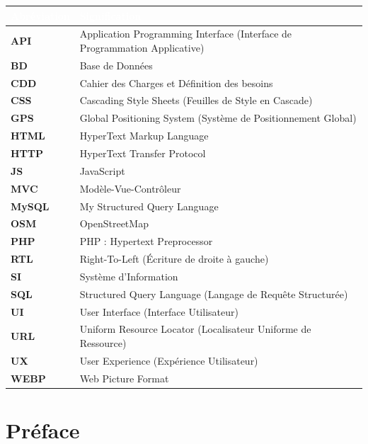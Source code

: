 \documentclass[12pt,a4paper]{report}
\begin{document}
\begin{tabularx}{\linewidth}{>{\bfseries\color{primary}}lX}
  \toprule
  \rowcolor{primary}
  \textcolor{white}{\textbf{Abréviation}} &
  \textcolor{white}{\textbf{Signification}} \\
  \midrule

  API  & Application Programming Interface (Interface de Programmation Applicative) \\
  BD   & Base de Données \\
  CDD  & Cahier des Charges et Définition des besoins \\
  CSS  & Cascading Style Sheets (Feuilles de Style en Cascade) \\
  GPS  & Global Positioning System (Système de Positionnement Global) \\
  HTML & HyperText Markup Language \\
  HTTP & HyperText Transfer Protocol \\
  JS   & JavaScript \\
  MVC  & Modèle-Vue-Contrôleur \\
  MySQL & My Structured Query Language \\
  OSM  & OpenStreetMap \\
  PHP  & PHP : Hypertext Preprocessor \\
  RTL  & Right-To-Left (Écriture de droite à gauche) \\
  SI   & Système d'Information \\
  SQL  & Structured Query Language (Langage de Requête Structurée) \\
  UI   & User Interface (Interface Utilisateur) \\
  URL  & Uniform Resource Locator (Localisateur Uniforme de Ressource) \\
  UX   & User Experience (Expérience Utilisateur) \\
  WEBP & Web Picture Format \\

  \bottomrule
\end{tabularx}

\listoftables
{}
\newpage

\listoffigures
{}
\newpage

\cleardoublepage
\chapter*{Préface}
\end{document}
